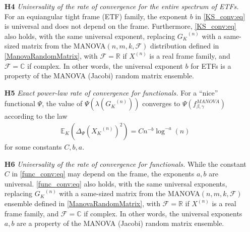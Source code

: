 \documentclass[a4paper,12pt]{article}
\newcommand{\TODO}[1]{ {\tt \color{red} [TODO:#1] } }
\newcommand{\R}{\ensuremath{\mathbb{R}}}
\newcommand{\E}{\ensuremath{\mathbb{E}}}
\newcommand{\C}{\ensuremath{\mathbb{C}}}
\newcommand{\Fc}{\ensuremath{\mathcal{F}}}
\newcommand{\m}{m}
\newcommand{\specstat}{\ensuremath{\Psi}}
\newcommand{\Xk}{\ensuremath{X_K}}
\newcommand{\Gk}{\ensuremath{G_K}}
\begin{document}
\begin{enumerate}
\item[{\bf H4}] {\em Universality of the rate of convergence for the
entire spectrum of ETFs.}
For an equiangular tight frame (ETF) family,  
the exponent
$b$ in \eqref{KS_conv:eq} is universal and does not depend on the frame. 
Furthermore, 
\eqref{KS_conv:eq} also holds, with the same universal exponent,
replacing $\Gk^{(n)}$ with a same-sized matrix
from the MANOVA$(n,\m,k,\Fc)$ distribution 
defined in \eqref{ManovaRandomMatrix}, with $\Fc=\R$ if $X^{(n)}$ is a real
frame family, and $\Fc=\C$ if complex. %
In other words, the universal exponent $b$ for ETFs 
is a property of the MANOVA
(Jacobi) random matrix ensemble.



\item[{\bf H5}] {\em Exact power-law rate of convergence for functionals.}
For a ``nice'' functional $\specstat$, the value of
$\specstat(\lambda(\Gk^{(n)}))$  converges
to $\specstat(f^{MANOVA}_{\beta,\gamma})$ according to the law
\begin{eqnarray} \label{func_conv:eq}
\E_{K}(\Delta_\specstat(\Xk^{(n)})^2)=Cn^{-b}\log^{-a}(n)
\end{eqnarray}
for some constants $C,b,a$.


\item[{\bf H6}]  {\em Universality of the rate of convergence for functionals.}
While the constant $C$ in \eqref{func_conv:eq} may depend on the frame,
the exponents 
$a,b$ are universal. \eqref{func_conv:eq} 
also holds, with the same universal exponents, 
replacing $\Gk^{(n)}$ with a same-sized matrix 
from the MANOVA$(n,\m,k,\Fc)$ ensemble 
defined in \eqref{ManovaRandomMatrix}, with  
$\Fc=\R$ if $X^{(n)}$ is a real
frame family, and $\Fc=\C$ if complex. 
In other words, the universal exponents $a,b$ 
are a property of the MANOVA
(Jacobi) random matrix ensemble.



\end{enumerate}
\end{document}
